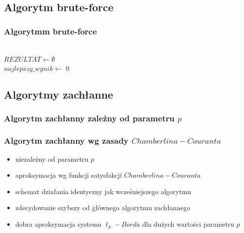 \documentclass{beamer}
\begin{document}
\subsection{Algorytm brute-force}
\begin{frame}
\frametitle{Algorytmm brute-force}
\begin{algorithm}[H]
\SetAlgoLined
{}
~\\
$REZULTAT \longleftarrow \emptyset $ \\
$najlepszy\_wynik \longleftarrow $ 0 \\
\end{algorithm}
\end{frame}

\subsection{Algorytmy zachłanne}
\begin{frame}
\frametitle{Algorytm zachłanny zależny od parametru $p$}

\begin{algorithm}[H]
{}
\end{algorithm}

\end{frame}

\begin{frame}
\frametitle{Algorytm zachłanny wg zasady $Chamberlina-Couranta$}
\begin{itemize}
\item niezależny od parametru $p$
\item aproksymacja wg funkcji satysfakcji $Chamberlina-Couranta$
\item schemat działania identyczny jak wcześniejszego algorytmu
\item zdecydowanie szybszy od głównego algorytmu zachłannego
\item dobra aproksymacja systemu $\ell_p-Borda$ dla dużych wartości parametru $p$   
\end{itemize}

\end{frame}
\end{document}
